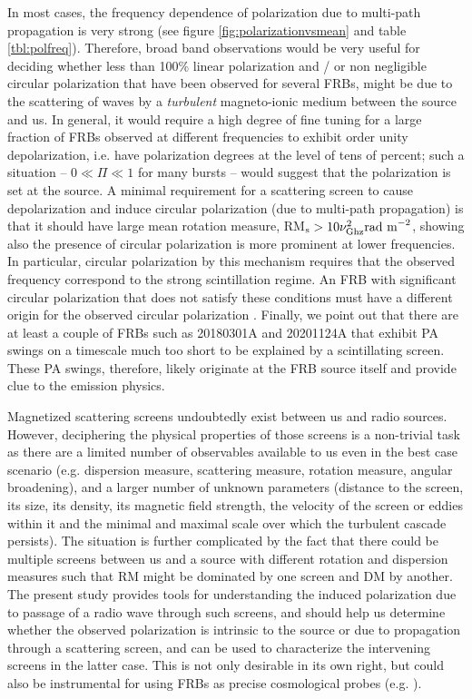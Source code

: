 \documentclass[fleqn,usenatbib]{mnras}
\begin{document}
	
	In most cases, the frequency dependence of polarization due to multi-path propagation is very strong (see figure \ref{fig:polarizationvsmean} and table \ref{tbl:polfreq}). Therefore, broad band observations would be very useful for deciding whether less than 100\% linear polarization and / or non negligible circular polarization that have been observed for several FRBs, might be due to the scattering of waves by a {\it turbulent} magneto-ionic medium between the source and us. In general, it would require a high degree of fine tuning for a large fraction of FRBs observed at different frequencies to exhibit order unity depolarization, i.e. have polarization degrees at the level of tens of percent; such a situation -- $0\ll\Pi\ll 1$ for many bursts -- would suggest that the polarization is set at the source. A minimal requirement for a scattering screen to cause depolarization and induce circular polarization (due to multi-path propagation) is that it should have large mean rotation measure, RM$_{\rm s}>10\nu_{\rm Ghz}^{2}\mbox{rad m}^{-2}$, showing also the presence of circular polarization is more prominent at lower frequencies. In particular, circular polarization by this mechanism requires that the observed frequency correspond to the strong scintillation regime. An FRB with significant circular polarization that does not satisfy these conditions must have a different origin for the observed circular polarization \citep[e.g.,][]{LP1998}. Finally, we point out that there are at least a couple of FRBs such as 20180301A and 20201124A that exhibit PA swings on a timescale much too short to be explained by a scintillating screen. These PA swings, therefore, likely originate at the FRB source itself and provide clue to the emission physics.
	
	
	Magnetized scattering screens undoubtedly exist between us and radio sources. However, deciphering the physical properties of those screens is a non-trivial task as there are a limited number of observables available to us even in the best case scenario (e.g. dispersion measure, scattering measure, rotation measure, angular broadening), and a larger number of unknown parameters (distance to the screen, its size, its density, its magnetic field strength, the velocity of the screen or eddies within it and the minimal and maximal scale over which the turbulent cascade persists). The situation is further complicated by the fact that there could be multiple screens between us and a source with different rotation and dispersion measures such that RM might be dominated by one screen and DM by another. The present study provides tools for understanding the induced polarization due to passage of a radio wave through such screens, and should help us determine whether the observed polarization is intrinsic to the source or due to propagation through a scattering screen, and can be used to characterize the intervening screens in the latter case. This is not only desirable in its own right, but could also be instrumental for using FRBs as precise cosmological probes (e.g. \citealt{Caleb2019,Macquart20,Beniamini+21}).
	
\end{document}
